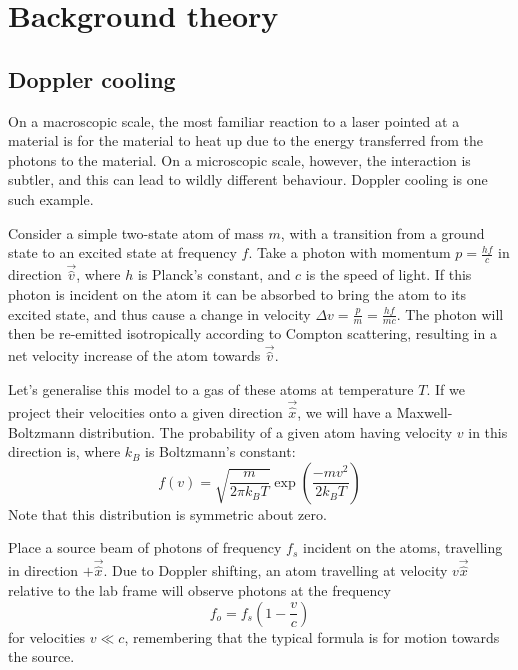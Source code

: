 \documentclass[11pt,twoside,a4paper]{article}
\begin{document}
\section{Background theory}
\subsection{Doppler cooling}
On a macroscopic scale, the most familiar reaction to a laser pointed at a material is for the material to heat up due to the energy transferred from the photons to the material. On a microscopic scale,
however, the interaction is subtler, and this can lead to wildly different behaviour. Doppler cooling is one such example.

Consider a simple two-state atom of mass \(m\), with a transition from a ground state to an excited state at frequency \(f\). Take a photon with momentum \(p=\frac{hf}{c}\) in direction \(\vec{\hat{v}}\), where \(h\) is Planck's constant, and \(c\) is the speed of light.
If this photon is incident on the atom it can be absorbed to bring the atom to
its excited state, and thus cause a change in velocity \(\Delta v=\frac{p}{m}=\frac{hf}{mc}\). The photon will then be re-emitted isotropically according to Compton scattering, resulting in a net velocity increase of the atom towards \(\vec{\hat{v}}\).

Let's generalise this model to a gas of these atoms at temperature \(T\). If we project their velocities onto a given direction \(\vec{\hat{x}}\), we will have a Maxwell-Boltzmann distribution. The probability of a given atom having velocity \(v\) in this direction is,
where \(k_B\) is Boltzmann's constant:~\cite{muller}
\begin{equation}
    f(v) = \sqrt{\frac{m}{2\pi k_B T}}\exp\left(\frac{-mv^2}{2k_B T}\right)
\end{equation}
Note that this distribution is symmetric about zero.

Place a source beam of photons of frequency \(f_s\) incident on the atoms, travelling in direction \(+\vec{\hat{x}}\).
Due to Doppler shifting, an atom travelling at velocity \(v\vec{\hat{x}}\) relative to the lab frame will observe photons at the frequency \cite{encyc}
\begin{equation}
    f_o = f_s\left(1-\frac{v}{c}\right)
\end{equation}
for velocities \(v\ll c\), remembering that the typical formula is for motion towards the source.
\end{document}
